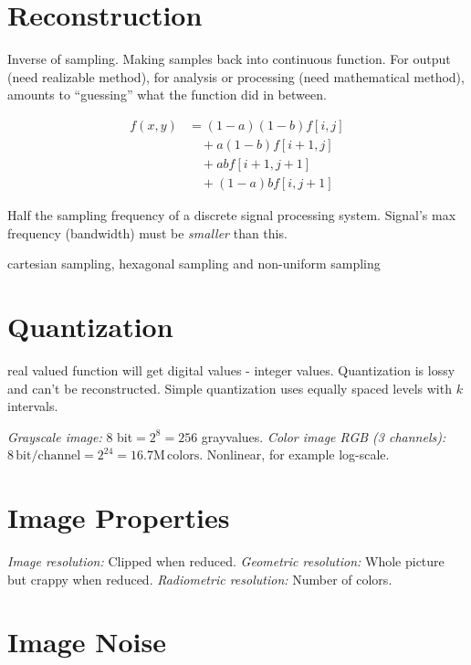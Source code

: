 \section{Reconstruction}
Inverse of sampling. Making samples back into continuous function. For output (need realizable method), for analysis or processing (need mathematical method), amounts to ``guessing'' what the function did in between.
\begin{compactdesc}
	\item[\lp{Bilinear interpolation}]
		\begin{align*}
			f(x,y)&=(1-a)(1-b)f[i,j]\\
			&\quad+a(1-b)f[i+1,j]\\
			&\quad+abf[i+1,j+1]\\
			&\quad+(1-a)bf[i,j+1]
		\end{align*}
	\item[\lp{Nyquist frequency}] Half the sampling frequency of a discrete signal processing system. Signal's max frequency (bandwidth) must be \emph{smaller} than this.
	\item[\lp{sampling grids}] cartesian sampling, hexagonal sampling and non-uniform sampling
\end{compactdesc}
\section{Quantization}
real valued function will get digital values - integer values. Quantization is lossy and can't be reconstructed. Simple quantization uses equally spaced levels with $k$ intervals.
\begin{compactdesc}
\item[\lp{usual quantization intervals}] \emph{Grayscale image:} $8$ bit$=2^{8}=256$ grayvalues. \emph{Color image RGB (3 channels):} $8\,\text{bit}/\text{channel}=2^{24}=16.7\text{M}\,\text{colors}$. Nonlinear, for example log-scale.
\end{compactdesc}
\section{Image Properties}
\emph{Image resolution:} Clipped when reduced. \emph{Geometric resolution:} Whole picture but crappy when reduced. \emph{Radiometric resolution:} Number of colors.
\section{Image Noise}

